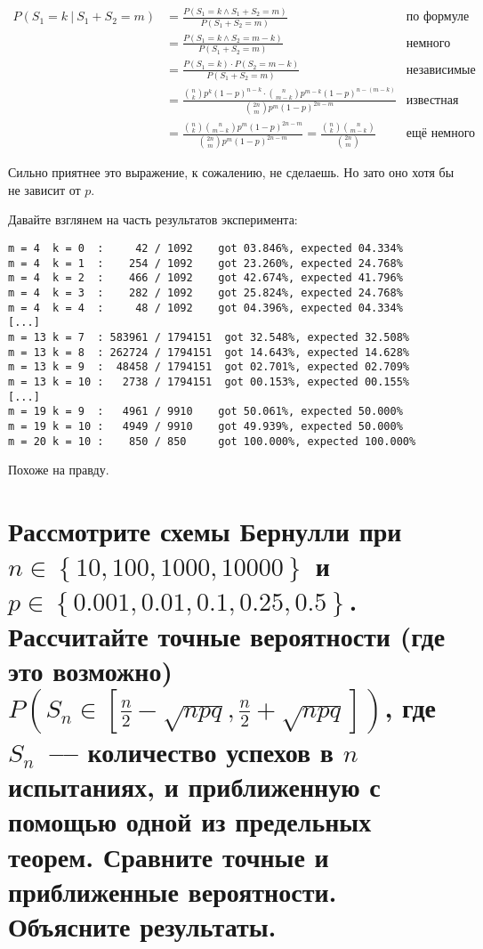 \documentclass{report}
\begin{document}
\begin{equation*}
\begin{aligned}
 P\left(S_1 = k\ |\ S_1 + S_2 = m\right)
 &= \frac{P\left(S_1 = k \land S_1 + S_2 = m\right)}{P\left(S_1 + S_2 = m\right)}
 &\text{по формуле условной вероятности}
 \\&= \frac{P\left(S_1 = k \land S_2 = m - k\right)}{P\left(S_1 + S_2 = m\right)}
 &\text{немного алгебры}
 \\&= \frac{P\left(S_1 = k \right) \cdot P\left( S_2 = m - k\right)}{P\left(S_1 + S_2 = m\right)}
 &\text{независимые события}
 \\&= \frac{{n \choose k}p^k (1-p)^{n-k} \cdot {n \choose {m-k}}p^{m-k} (1-p)^{n-(m-k)} }
 {{2n \choose m}p^{m} (1-p)^{2n-m}}
 &\text{известная формула для испытаний Бернулли}
 \\&= \frac{{n \choose k} {n \choose {m-k}} p^{m} (1-p)^{2n-m}}{{2n \choose m}p^{m} (1-p)^{2n-m}}
 =\frac{{n \choose k}  {n \choose {m-k}}}{{2n \choose m}}
 &\text{ещё немного алгебры}
\end{aligned}
\end{equation*}

Сильно приятнее это выражение, к сожалению, не сделаешь.
Но зато оно хотя бы не зависит от $p$.

Давайте взглянем на часть результатов эксперимента:

\begin{lstlisting}
m = 4  k = 0  :     42 / 1092    got 03.846%, expected 04.334%
m = 4  k = 1  :    254 / 1092    got 23.260%, expected 24.768%
m = 4  k = 2  :    466 / 1092    got 42.674%, expected 41.796%
m = 4  k = 3  :    282 / 1092    got 25.824%, expected 24.768%
m = 4  k = 4  :     48 / 1092    got 04.396%, expected 04.334%
[...]
m = 13 k = 7  : 583961 / 1794151  got 32.548%, expected 32.508%
m = 13 k = 8  : 262724 / 1794151  got 14.643%, expected 14.628%
m = 13 k = 9  :  48458 / 1794151  got 02.701%, expected 02.709%
m = 13 k = 10 :   2738 / 1794151  got 00.153%, expected 00.155%
[...]
m = 19 k = 9  :   4961 / 9910    got 50.061%, expected 50.000%
m = 19 k = 10 :   4949 / 9910    got 49.939%, expected 50.000%
m = 20 k = 10 :    850 / 850     got 100.000%, expected 100.000%
\end{lstlisting}

Похоже на правду.

\chapter{
Рассмотрите схемы Бернулли при $n \in \left\{10, 100, 1000, 10000\right\}$
и $p \in \left\{0.001, 0.01, 0.1, 0.25, 0.5\right\}$.
Рассчитайте точные вероятности (где это возможно)
$P\left(S_n \in \left[\frac{n}{2} - \sqrt{npq},\frac{n}{2} + \sqrt{npq}\right]\right)$,
где $S_n$~--– количество успехов в $n$ испытаниях,
и приближенную с помощью одной из предельных теорем.
Сравните точные и приближенные вероятности.
Объясните результаты.
}
\end{document}
